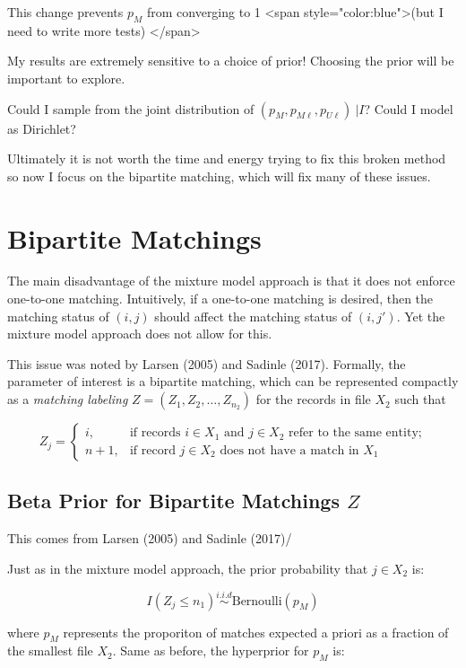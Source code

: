 \documentclass[11pt,reqno]{amsart}
\begin{document}
This change prevents $p_M$ from converging to 1 <span style="color:blue">(but I need to write more tests) </span>

My results are extremely sensitive to a choice of prior! Choosing the prior will be important to explore. 

Could I sample from the joint distribution of $(p_M, p_{M\ell}, p_{U\ell})\ | I$?  Could I model as Dirichlet?

Ultimately it is not worth the time and energy trying to fix this broken method so now I focus on the bipartite matching, which will fix many of these issues.

\section{Bipartite Matchings}

The main disadvantage of the mixture model approach is that it does not enforce one-to-one matching.  Intuitively, if a one-to-one matching is desired, then the matching status of $(i,j)$ should affect the matching status of $(i,j')$.  Yet the mixture model approach does not allow for this.  

This issue was noted by Larsen (2005) and Sadinle (2017).  Formally, the parameter of interest is a bipartite matching, which can be represented compactly as a \textit{matching labeling} $Z= (Z_1, Z_2,\dots, Z_{n_2})$ for the records in file $X_2$ such that

\[ Z_j = \begin{cases} i, & \text{if records $i\in X_1$ and $j\in X_2$ refer to the same entity;} \\
				n+1, & \text{if record $j\in X_2$ does not have a match in $X_1$} \end{cases} \]

\subsection{Beta Prior for Bipartite Matchings $Z$}

This comes from Larsen (2005) and Sadinle (2017)/

Just as in the mixture model approach, the prior probability that $j \in X_2$ is:

$$ I(Z_j \leq n_1)  \overset{i.i.d}{\sim} \text{Bernoulli}(p_M)$$

where $p_M$ represents the proporiton of matches expected a priori as a fraction of the smallest file $X_2$.  Same as before, the hyperprior for $p_M$ is:
\end{document}
